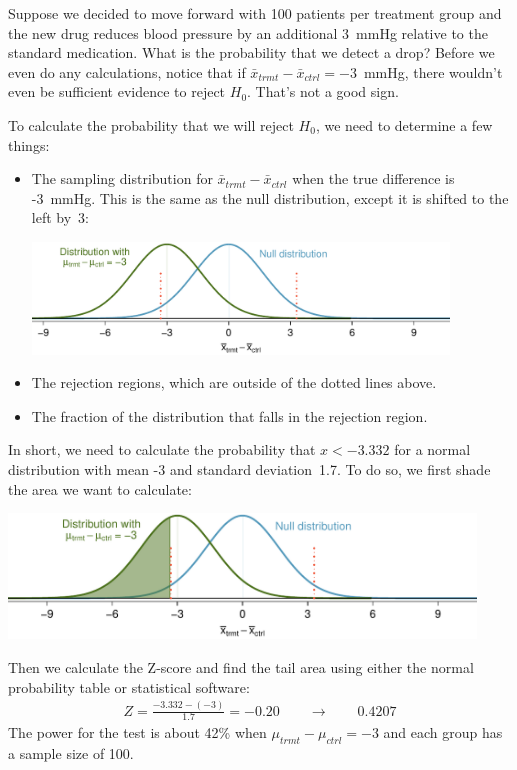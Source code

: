 \begin{example}{Suppose we decided to move forward with 100 patients per treatment group and the new drug reduces blood pressure by an additional 3~mmHg relative to the standard medication. What is the probability that we detect a drop?}\label{PowerFor100AtNeg3}
Before we even do any calculations, notice that if $\bar{x}_{trmt} - \bar{x}_{ctrl} = -3$~mmHg, there wouldn't even be sufficient evidence to reject $H_0$. That's not a good sign.

To calculate the probability that we will reject $H_0$, we need to determine a few things:
\begin{itemize}
\setlength{\itemsep}{0mm}
\item The sampling distribution for $\bar{x}_{trmt} - \bar{x}_{ctrl}$ when the true difference is -3~mmHg. This is the same as the null distribution, except it is shifted to the left by~3:
\begin{center}
\includegraphics[width=0.87\textwidth]{ch_inference_for_means/figures/power_null_0_1-7/power_null_C_0_1-7_with_alt_at_3}
\end{center}
\item The rejection regions, which are outside of the dotted lines above.
\item The fraction of the distribution that falls in the rejection region.
\end{itemize}
In short, we need to calculate the probability that $x < -3.332$ for a normal distribution with mean -3 and standard deviation~1.7. To do so, we first shade the area we want to calculate:
\begin{center}
\includegraphics[width=0.93\textwidth]{ch_inference_for_means/figures/power_null_0_1-7/power_null_D_0_1-7_with_alt_at_3_and_shaded}
\end{center}
Then we calculate the Z-score and find the tail area using either the normal probability table or statistical software:
\begin{align*}
Z = \frac{-3.332 - (-3)}{1.7} = -0.20 \qquad \to \qquad 0.4207
\end{align*}
The power for the test is about 42\% when $\mu_{trmt} - \mu_{ctrl} = -3$ and each group has a sample size of 100.
\end{example}

